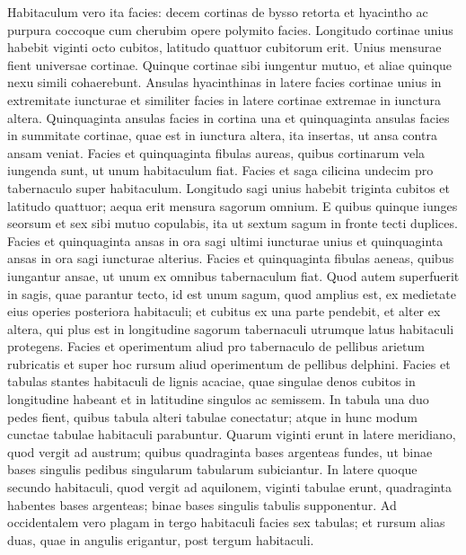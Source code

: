 \begin{biblechapter}  
\verse Habitaculum vero ita facies: decem cortinas de bysso retorta et hyacintho ac purpura coccoque cum cherubim opere polymito facies. 
\verse Longitudo cortinae unius habebit viginti octo cubitos, latitudo quattuor cubitorum erit. Unius mensurae fient universae cortinae. 
\verse Quinque cortinae sibi iungentur mutuo, et aliae quinque nexu simili cohaerebunt. 
\verse Ansulas hyacinthinas in latere facies cortinae unius in extremitate iuncturae et similiter facies in latere cortinae extremae in iunctura altera. 
\verse Quinquaginta ansulas facies in cortina una et quinquaginta ansulas facies in summitate cortinae, quae est in iunctura altera, ita insertas, ut ansa contra ansam veniat. 
\verse Facies et quinquaginta fibulas aureas, quibus cortinarum vela iungenda sunt, ut unum habitaculum fiat. 
\verse Facies et saga cilicina undecim pro tabernaculo super habitaculum. 
\verse Longitudo sagi unius habebit triginta cubitos et latitudo quattuor; aequa erit mensura sagorum omnium. 
\verse E quibus quinque iunges seorsum et sex sibi mutuo copulabis, ita ut sextum sagum in fronte tecti duplices. 
\verse Facies et quinquaginta ansas in ora sagi ultimi iuncturae unius et quinquaginta ansas in ora sagi iuncturae alterius. 
\verse Facies et quinquaginta fibulas aeneas, quibus iungantur ansae, ut unum ex omnibus tabernaculum fiat. 
\verse Quod autem superfuerit in sagis, quae parantur tecto, id est unum sagum, quod amplius est, ex medietate eius operies posteriora habitaculi; 
\verse et cubitus ex una parte pendebit, et alter ex altera, qui plus est in longitudine sagorum tabernaculi utrumque latus habitaculi protegens. 
\verse Facies et operimentum aliud pro tabernaculo de pellibus arietum rubricatis et super hoc rursum aliud operimentum de pellibus delphini. 
\verse Facies et tabulas stantes habitaculi de lignis acaciae, 
\verse quae singulae denos cubitos in longitudine habeant et in latitudine singulos ac semissem.  
\verse In tabula una duo pedes fient, quibus tabula alteri tabulae conectatur; atque in hunc modum cunctae tabulae habitaculi parabuntur. 
\verse Quarum viginti erunt in latere meridiano, quod vergit ad austrum; 
\verse quibus quadraginta bases argenteas fundes, ut binae bases singulis pedibus singularum tabularum subiciantur. 
\verse In latere quoque secundo habitaculi, quod vergit ad aquilonem, viginti tabulae erunt, 
\verse quadraginta habentes bases argenteas; binae bases singulis tabulis supponentur. 
\verse Ad occidentalem vero plagam in tergo habitaculi facies sex tabulas; 
\verse et rursum alias duas, quae in angulis erigantur, post tergum habitaculi. 

\end{biblechapter}
